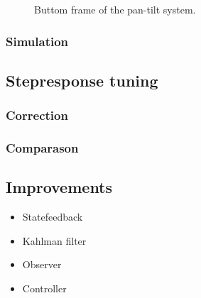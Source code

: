 \documentclass[../../main]{subfiles}
\begin{document}
\begin{figure}[h]
  \centering
  
  \caption{Buttom frame of the pan-tilt system.}
\end{figure}

\subsubsection{Simulation}

\subsection{Stepresponse tuning}
\subsubsection{Correction}
\subsubsection{Comparason}

\subsection{Improvements}

\begin{itemize}
  \item Statefeedback
  \item Kahlman filter
  \item Observer
  \item Controller
\end{itemize}
\end{document}
